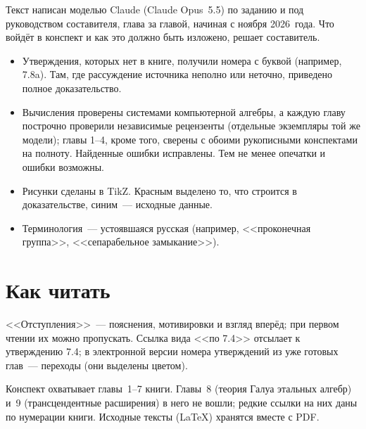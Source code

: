 Текст написан моделью Claude (Claude Opus~5.5) по заданию и под руководством составителя, глава за главой,
начиная с ноября 2026~года. Что войдёт в конспект и как это должно быть изложено, решает составитель.

\begin{itemize}[leftmargin=*]
\item Утверждения, которых нет в книге, получили номера с буквой (например, 7.8a). Там, где рассуждение источника
неполно или неточно, приведено полное доказательство.
\item Вычисления проверены системами компьютерной алгебры, а каждую главу построчно проверили независимые рецензенты
(отдельные экземпляры той же модели); главы 1--4, кроме того, сверены с обоими рукописными конспектами на полноту.
Найденные ошибки исправлены. Тем не менее опечатки и ошибки возможны.
\item Рисунки сделаны в TikZ. Красным выделено то, что строится в доказательстве, синим~--- исходные данные.
\item Терминология~--- устоявшаяся русская (например, <<проконечная группа>>, <<сепарабельное замыкание>>).
\end{itemize}

\section*{Как читать}

<<Отступления>>~--- пояснения, мотивировки и взгляд вперёд; при первом чтении их можно пропускать. Ссылка вида
<<по 7.4>> отсылает к утверждению 7.4; в электронной версии номера утверждений из уже готовых глав~--- переходы
(они выделены цветом).

Конспект охватывает главы~1--7 книги. Главы~8 (теория Галуа этальных алгебр) и~9 (трансцендентные расширения) в него
не вошли; редкие ссылки на них даны по нумерации книги. Исходные тексты (\LaTeX) хранятся вместе с PDF.
